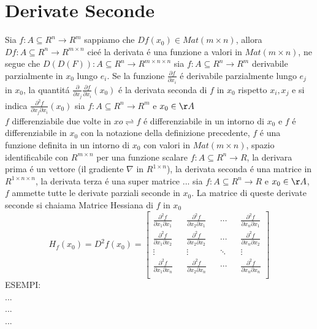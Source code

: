 \section{Derivate Seconde}
Sia $f:A\subseteq R^n \rightarrow R^m$ sappiamo che $Df(x_0)\in Mat(m\times n)$, allora $Df:A\subseteq R^{n} \rightarrow R^{m\times n}$ cie\'e la derivata \'e una funzione a valori in $Mat(m\times n)$, ne segue che $D(D(F)):A\subseteq R^n \rightarrow R^{m\times n\times n}$
sia $f:A\subseteq R^n \rightarrow R^m$ derivabile parzialmente in $x_0$ lungo $e_i$. Se la funzione $\frac{\partial{f}}{\partial{x_i}}$ \'e derivabile parzialmente lungo $e_j$ in $x_0$, la quantit\'a $\frac{\partial}{\partial{x_j}}\frac{\partial{f}}{\partial{x_i}}(x_0)$ \'e la derivata seconda di $f$ in $x_0$ rispetto $x_i,x_j$ e si indica $\frac{\partial^2f}{\partial{x_j}\partial{x_i}}(x_0)$
sia $f:A\subseteq R^n \rightarrow R^m$ e $x_0\in\AA$\\
$f$ differenziabile due volte in $xo \rightleftharpoons f$ \'e differenziabile in un intorno di $x_0$ e $f$ \'e differenziabile in $x_0$
\observation
con la notazione della definizione precedente, $f$ \'e una funzione definita in un intorno di $x_0$ con valori in $Mat(m\times n)$, spazio identificabile con $R^{m\times n}$
\observation
per una funzione scalare $f:A\subseteq R^n \rightarrow R$, la derivara prima \'e un vettore (il gradiente $\nabla$ in $R^{1\times n}$), la derivata seconda \'e una matrice in $R^{1\times n \times n}$, la derivata terza \'e una super matrice ...
sia $f:A\subseteq R^n \rightarrow R$ e $x_0\in\AA$, $f$ ammette tutte le derivate parziali seconde in $x_0$. La matrice di queste derivate seconde si chaiama Matrice Hessiana di $f$ in $x_0$
$$H_f(x_0)=D^2f(x_0) = \begin{bmatrix}
\frac{\partial^2f}{\partial{x_1}\partial{x_1}} && \frac{\partial^2f}{\partial{x_2}\partial{x_1}} && \dotsb && \frac{\partial^2f}{\partial{x_n}\partial{x_1}} \\
\frac{\partial^2f}{\partial{x_1}\partial{x_2}} && \frac{\partial^2f}{\partial{x_2}\partial{x_2}} && \dotsb && \frac{\partial^2f}{\partial{x_n}\partial{x_2}} \\
\vdots && \vdots && \ddots && \vdots \\
\frac{\partial^2f}{\partial{x_1}\partial{x_n}} && \frac{\partial^2f}{\partial{x_2}\partial{x_n}} && \dotsb && \frac{\partial^2f}{\partial{x_n}\partial{x_n}} \\
\end{bmatrix}$$ 
ESEMPI:\\
...\\
...\\
...\\

